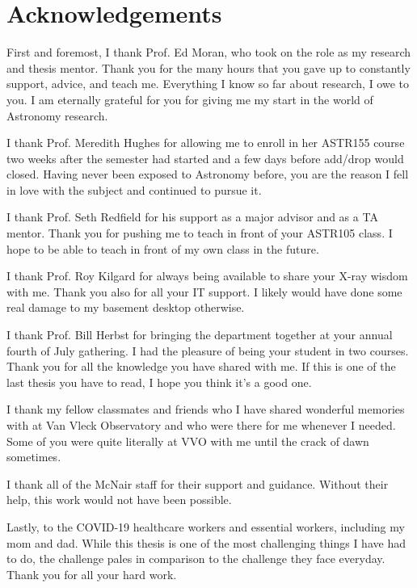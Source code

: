 

\chapter*{Acknowledgements}

First and foremost, I thank Prof. Ed Moran, who took on the role as my research and thesis mentor.
Thank you for the many hours that you gave up to constantly support, advice, and teach me.
Everything I know so far about research, I owe to you.
I am eternally grateful for you for giving me my start in the world of Astronomy research.


I thank Prof. Meredith Hughes for allowing me to enroll in her ASTR155 course two weeks after the semester had started and a few days before add/drop would closed.
Having never been exposed to Astronomy before, you are the reason I fell in love with the subject and continued to pursue it.

I thank Prof. Seth Redfield for his support as a major advisor and as a TA mentor.
Thank you for pushing me to teach in front of your ASTR105 class. 
I hope to be able to teach in front of my own class in the future.

I thank Prof. Roy Kilgard for always being available to share your X-ray wisdom with me.
Thank you also for all your IT support.
I likely would have done some real damage to my basement desktop otherwise.

I thank Prof. Bill Herbst for bringing the department together at your annual fourth of July gathering.
I had the pleasure of being your student in two courses. 
Thank you for all the knowledge you have shared with me.
If this is one of the last thesis you have to read, I hope you think it's a good one.


I thank my fellow classmates and friends who I have shared wonderful memories with at Van Vleck Observatory and who were there for me whenever I needed.
Some of you were quite literally at VVO with me until the crack of dawn sometimes.


I thank all of the McNair staff for their support and guidance. 
Without their help, this work would not have been possible.
\newpage

\vspace*{\fill}
Lastly, to the COVID-19 healthcare workers and essential workers, including my mom and dad. 
While this thesis is one of the most challenging things I have had to do, the challenge pales in comparison to the challenge they face everyday.
Thank you for all your hard work.
\vspace*{\fill}




